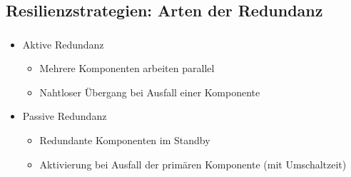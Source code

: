 \subsection{Resilienzstrategien: Arten der Redundanz}
\begin{frame}
    \frametitle{\insertsection}
    \framesubtitle{\insertsubsection}
        \begin{itemize}
            \item Aktive Redundanz
                \begin{itemize}
                    \item Mehrere Komponenten arbeiten parallel
                    \item Nahtloser Übergang bei Ausfall einer Komponente
                \end{itemize}
            \item Passive Redundanz
                \begin{itemize}
                    \item Redundante Komponenten im Standby
                    \item Aktivierung bei Ausfall der primären Komponente (mit Umschaltzeit)
                \end{itemize}
        \end{itemize}


\end{frame}


